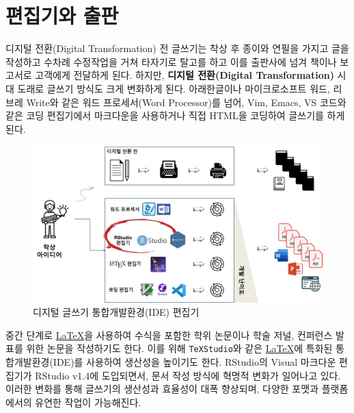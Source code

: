 \documentclass[
  letterpaper,
]{book}
\begin{document}
\hypertarget{uxd3b8uxc9d1uxae30uxc640-uxcd9cuxd310}{%
\chapter{편집기와 출판}\label{uxd3b8uxc9d1uxae30uxc640-uxcd9cuxd310}}

디지털 전환(Digital Transformation) 전 글쓰기는 착상 후 종이와 연필을
가지고 글을 작성하고 수차례 수정작업을 거쳐 타자기로 탈고를 하고 이를
출판사에 넘겨 책이나 보고서로 고객에게 전달하게 된다. 하지만,
\textbf{디지털 전환(Digital Transformation)} 시대 도래로 글쓰기 방식도
크게 변화하게 된다. 아래한글이나 마이크로소프트 워드, 리브레 Write와
같은 워드 프로세서(Word Processor)를 넘어, Vim, Emacs, VS 코드와 같은
코딩 편집기에서 마크다운을 사용하거나 직접 HTML을 코딩하여 글쓰기를 하게
된다.

\begin{figure}

{\centering \includegraphics{images/ide_writing.jpg}

}

\caption{디지털 글쓰기 통합개발환경(IDE) 편집기}

\end{figure}

중간 단계로 \href{http://example.org}{\LaTeX}을 사용하여 수식을 포함한
학위 논문이나 학술 저널, 컨퍼런스 발표를 위한 논문을 작성하기도 한다.
이를 위해 \texttt{TeXStudio}와 같은 \href{http://example.org}{\LaTeX}에
특화된 통합개발환경(IDE)를 사용하여 생산성을 높이기도 한다. RStudio의
Visual 마크다운 편집기가 RStudio v1.4에 도입되면서, 문서 작성 방식에
혁명적 변화가 일어나고 있다. 이러한 변화를 통해 글쓰기의 생산성과
효율성이 대폭 향상되며, 다양한 포맷과 플랫폼에서의 유연한 작업이
가능해진다.
\end{document}
